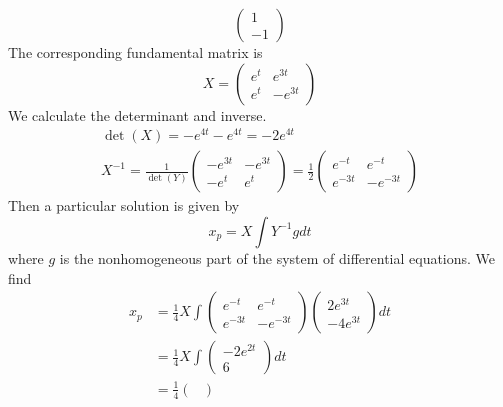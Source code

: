 \documentclass[11pt, titlepage]{article}
\begin{document}
\begin{enumerate}
\begin{solution}
\[\begin{pmatrix}
                1 \\
                -1
            \end{pmatrix}
            \]
            The corresponding fundamental matrix is
            \[
            X =
            \begin{pmatrix}
                e^t & e^{3t} \\
                e^t & -e^{3t}
            \end{pmatrix}
            \]
            We calculate the determinant and inverse.
            \begin{gather*}
                \det(X) = -e^{4t} - e^{4t} = -2e^{4t} \\
                X^{-1} = \frac{1}{\det(Y)}
                \begin{pmatrix}
                    -e^{3t} & -e^{3t} \\
                    -e^{t} & e^{t}
                \end{pmatrix} = \frac{1}{2}
                \begin{pmatrix}
                    e^{-t} & e^{-t} \\
                    e^{-3t} & -e^{-3t}
                \end{pmatrix}
            \end{gather*}
            Then a particular solution is given by
            \[
            x_p = X \int Y^{-1} g dt
            \]
            where $g$ is the nonhomogeneous part of the system of differential equations. We find
            \begin{align*}
                x_p &= \frac{1}{4} X \int
                \begin{pmatrix}
                    e^{-t} & e^{-t} \\
                    e^{-3t} & -e^{-3t}
                \end{pmatrix}
                \begin{pmatrix}
                    2e^{3t} \\
                    -4e^{3t}
                \end{pmatrix} dt \\
                &= \frac{1}{4} X \int
                \begin{pmatrix}
                    -2e^{2t} \\
                    6
                \end{pmatrix} dt \\
                &= \frac{1}{4}
                \begin{pmatrix}

\end{pmatrix}
\end{align*}
\end{solution}
\end{enumerate}
\end{document}
